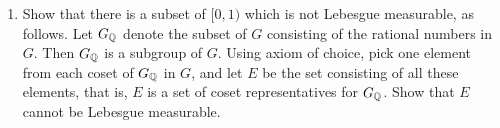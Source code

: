 \begin{enumerate}[label=\arabic*),ref=\arabic*]
\begin{enumerate}[label=\alph*),ref=\theenumi\alph*)]
    \item Show that there is a subset of $[0,1)$ which is not Lebesgue measurable, as follows. Let $G_{\mathbb{Q}}$ denote the subset of $G$ consisting of the rational numbers in $G$. Then $G_{\mathbb{Q}}$ is a subgroup of $G$. Using axiom of choice, pick one element from each coset of $G_{\mathbb{Q}}$ in $G$, and let $E$ be the set consisting of all these elements, that is, $E$ is a set of coset representatives for $G_{\mathbb{Q}}$. Show that $E$ cannot be Lebesgue measurable.
\end{enumerate}

\end{enumerate}